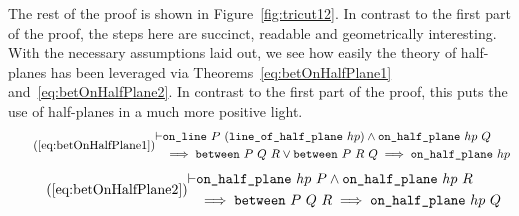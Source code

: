 The rest of the proof is shown in Figure~\ref{fig:tricut12}. In contrast to the first part of the proof, the steps here are succinct, readable and geometrically interesting. With the necessary assumptions laid out, we see how easily the theory of half-planes has been leveraged via Theorems~\ref{eq:betOnHalfPlane1} and~\ref{eq:betOnHalfPlane2}. In contrast to the first part of the proof, this puts the use of half-planes in a much more positive light.
\begin{equation*}
\tag{\ref{eq:betOnHalfPlane1}}
  \begin{split}
    \vdash&\code{on\_line}\ P\ (\code{line\_of\_half\_plane}\ hp) \wedge \code{on\_half\_plane}\ hp\ Q\\
    &\implies \between{P}{Q}{R} \vee \between{P}{R}{Q} \implies \code{on\_half\_plane}\ hp
  \end{split}
\end{equation*}
\begin{equation*}\tag{\ref{eq:betOnHalfPlane2}}
\begin{split}
    \vdash&\code{on\_half\_plane}\ hp\ P \wedge \code{on\_half\_plane}\ hp\ R\\
    &\implies \between{P}{Q}{R} \implies \code{on\_half\_plane}\ hp\ Q
  \end{split}
\end{equation*}


